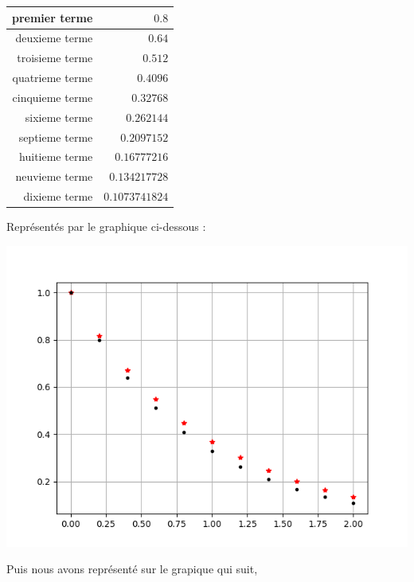 \documentclass{article}
\begin{document}
\begin{center}
\begin{tabular}{| r | r |}
\hline
{premier terme} & $0.8$\\
\hline
{deuxieme terme} & $0.64$\\
\hline
{troisieme terme} & $0.512$\\
\hline
{quatrieme terme} & $0.4096$\\
\hline
{cinquieme terme} & $0.32768$\\
\hline
{sixieme terme} & $0.262144$\\
\hline
{septieme terme} & $0.2097152$\\
\hline
{huitieme terme} & $0.16777216$\\
\hline
{neuvieme terme} & $0.134217728$\\
\hline
{dixieme terme} & $0.1073741824$\\
\hline
\end{tabular}
\end{center}

Représentés par le graphique ci-dessous : 

\begin{center}
	\includegraphics[scale=0.5]{CourbeU.png}
\end{center}

Puis nous avons représenté sur le grapique qui suit, 
\end{document}
